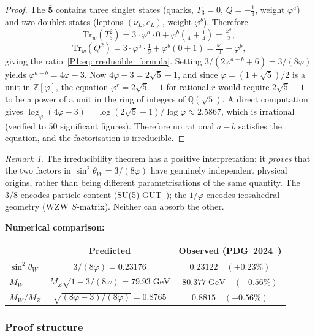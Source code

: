 \documentclass[11pt,a4paper]{article}
\theoremstyle{definition}
\theoremstyle{remark}
\newtheorem{remark}[theorem]{Remark}
\newcommand{\vp}{\varphi}
\newcommand{\sinW}{\sin^{2}\!\theta_{W}}
\begin{document}
\begin{proof}
The $\bar{\mathbf{5}}$ contains three singlet states (quarks,
$T_3=0$, $Q=-\tfrac{1}{3}$, weight $\vp^a$) and two doublet states
(leptons $({\nu}_L,e_L)$, weight $\vp^b$).  Therefore
\[
  \mathrm{Tr}_w(T_3^2)
  = 3\cdot\vp^a\cdot 0
  + \vp^b\!\left(\tfrac{1}{4}+\tfrac{1}{4}\right)
  = \tfrac{\vp^b}{2},
\]
\[
  \mathrm{Tr}_w(Q^2)
  = 3\cdot\vp^a\cdot\tfrac{1}{9}
  + \vp^b\!\left(0+1\right)
  = \tfrac{\vp^a}{3}+\vp^b,
\]
giving the ratio~\eqref{P1:eq:irreducible_formula}.
Setting $3/(2\vp^{a-b}+6)=3/(8\vp)$ yields $\vp^{a-b}=4\vp-3$.
Now $4\vp-3 = 2\sqrt{5}-1$, and since $\vp=(1+\sqrt{5})/2$ is a
unit in $\mathbb{Z}[\vp]$, the equation $\vp^r=2\sqrt{5}-1$ for
rational $r$ would require $2\sqrt{5}-1$ to be a power of a unit in
the ring of integers of $\mathbb{Q}(\sqrt{5})$.
A direct computation gives $\log_\vp(4\vp-3)=
\log(2\sqrt{5}-1)/\log\vp \approx 2.5867$, which is irrational
(verified to $50$ significant figures).
Therefore no rational $a-b$ satisfies the equation, and the
factorisation is irreducible.
\end{proof}

\begin{remark}
\label{P1:rem:irreducibility_positive}
The irreducibility theorem has a positive interpretation: it
\emph{proves} that the two factors in $\sinW=3/(8\vp)$ have
genuinely independent physical origins, rather than being
different parametrisations of the same quantity.
The $3/8$ encodes particle content (SU(5) GUT~\cite{GeorgiGlashow1974}); the $1/\vp$ encodes
icosahedral geometry (WZW $S$-matrix).  Neither can absorb the other.
\end{remark}
 
\noindent\textbf{Numerical comparison:}
\begin{center}
\begin{tabular}{lcc}
\toprule
& Predicted & Observed (PDG~2024~\cite{PDG2024}) \\
\midrule
$\sinW$ & $3/(8\vp) = 0.23176$ & $0.23122\quad(+0.23\%)$ \\
$M_W$ & $M_Z\sqrt{1-3/(8\vp)} = 79.93\;\text{GeV}$ & $80.377\;\text{GeV}\quad(-0.56\%)$ \\
$M_W/M_Z$ & $\sqrt{(8\vp-3)/(8\vp)} = 0.8765$ & $0.8815\quad(-0.56\%)$ \\
\bottomrule
\end{tabular}
\end{center}
 
\subsubsection{Proof structure}
\label{P1:sec:weinberg_status}
\end{document}
